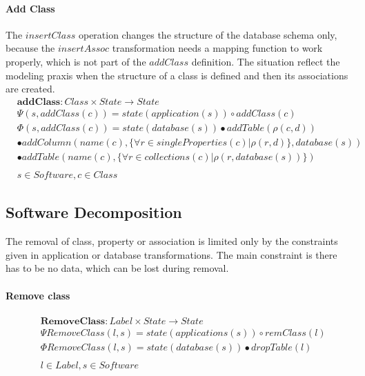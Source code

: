 \documentclass[11pt]{article}
\begin{document}
\paragraph{Add Class} The $insertClass$ operation changes the structure of the database schema only, because the $insertAssoc$ transformation needs a mapping function to work properly, which is not part of the $addClass$ definition. The situation reflect the modeling praxis when the structure of a class is defined and then its associations are created.
\begin{align*}
& \mathbf{addClass} : Class \times State \rightarrow State \\
& \Psi(s, addClass(c)) = state(application(s)) \circ addClass(c) \\
& \Phi(s, addClass(c)) = state(database(s))  \bullet addTable(\rho(c,d)) \\ 
& \bullet addColumn(name(c), \{\forall r \in singleProperties(c) | \rho(r,d)\}, database(s)) \\
& \bullet addTable(name(c), \{\forall r \in collections(c) | \rho(r,database(s))\})  \\\\
& s \in Software, c \in Class
\end{align*}




\subsection{Software Decomposition}
The removal of class, property or association is limited only by the constraints given in application or database transformations. The main constraint is there has to be no data, which can be lost during removal. 
\paragraph{Remove class}
\begin{align*}
&	\mathbf{RemoveClass}: Label \times State \rightarrow State  \\
&	\Psi RemoveClass(l, s) = state(applications(s)) \circ remClass(l) \\
&	\Phi RemoveClass(l, s) = state(database(s)) \bullet dropTable(l) \\\\
&	l \in Label, s \in Software 
\end{align*}
\end{document}

